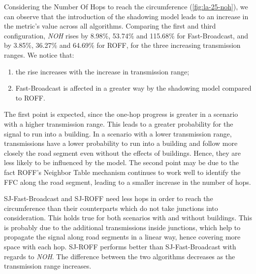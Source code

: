 		
		Considering the Number Of Hops to reach the circumference (\ref{fig:la-25-noh}), we can observe that the introduction of the shadowing model leads to an increase in the metric's value across all algorithms. Comparing the first and third configuration, \textit{NOH} rises by 8.98\%, 53.74\% and 115.68\% for Fast-Broadcast, and by 3.85\%, 36.27\% and 64.69\% for ROFF, for the three increasing transmission ranges. We notice that:
		\begin{enumerate}
			\item the rise increases with the increase in transmission range;
			\item Fast-Broadcast is affected in a greater way by the shadowing model compared to ROFF.
		\end{enumerate}
		The first point is expected, since the one-hop progress is greater in a scenario with a higher transmission range. This leads to a greater probability for the signal to run into a building. In a scenario with a lower transmission range, transmissions have a lower probability to run into a building and follow more closely the road segment even without the effects of buildings. Hence, they are less likely to be influenced by the model. The second point may be due to the fact ROFF's Neighbor Table mechanism continues to work well to identify the FFC along the road segment, leading to a smaller increase in the number of hops.
		
		
		SJ-Fast-Broadcast and SJ-ROFF need less hops in order to reach the circumference than their counterparts which do not take junctions into consideration. This holds true for both scenarios with and without buildings. This is probably due to the additional transmissions inside junctions, which help to propagate the signal along road segments in a linear way, hence covering more space with each hop. SJ-ROFF performs better than SJ-Fast-Broadcast with regards to \textit{NOH}. The difference between the two algorithms decreases as the transmission range increases.
		
